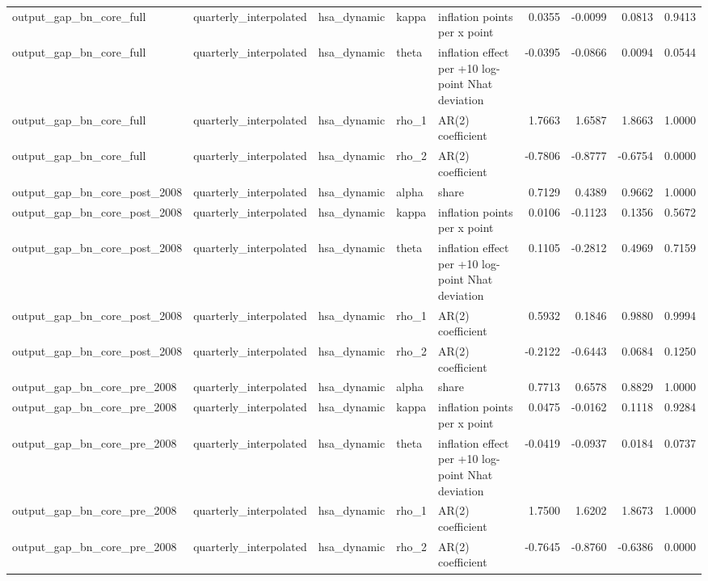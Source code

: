 \begin{tabular}{lllllrrrr}
output\_gap\_bn\_core\_full & quarterly\_interpolated & hsa\_dynamic & kappa & inflation points per x point & 0.0355 & -0.0099 & 0.0813 & 0.9413 \\
output\_gap\_bn\_core\_full & quarterly\_interpolated & hsa\_dynamic & theta & inflation effect per +10 log-point Nhat deviation & -0.0395 & -0.0866 & 0.0094 & 0.0544 \\
output\_gap\_bn\_core\_full & quarterly\_interpolated & hsa\_dynamic & rho\_1 & AR(2) coefficient & 1.7663 & 1.6587 & 1.8663 & 1.0000 \\
output\_gap\_bn\_core\_full & quarterly\_interpolated & hsa\_dynamic & rho\_2 & AR(2) coefficient & -0.7806 & -0.8777 & -0.6754 & 0.0000 \\
output\_gap\_bn\_core\_post\_2008 & quarterly\_interpolated & hsa\_dynamic & alpha & share & 0.7129 & 0.4389 & 0.9662 & 1.0000 \\
output\_gap\_bn\_core\_post\_2008 & quarterly\_interpolated & hsa\_dynamic & kappa & inflation points per x point & 0.0106 & -0.1123 & 0.1356 & 0.5672 \\
output\_gap\_bn\_core\_post\_2008 & quarterly\_interpolated & hsa\_dynamic & theta & inflation effect per +10 log-point Nhat deviation & 0.1105 & -0.2812 & 0.4969 & 0.7159 \\
output\_gap\_bn\_core\_post\_2008 & quarterly\_interpolated & hsa\_dynamic & rho\_1 & AR(2) coefficient & 0.5932 & 0.1846 & 0.9880 & 0.9994 \\
output\_gap\_bn\_core\_post\_2008 & quarterly\_interpolated & hsa\_dynamic & rho\_2 & AR(2) coefficient & -0.2122 & -0.6443 & 0.0684 & 0.1250 \\
output\_gap\_bn\_core\_pre\_2008 & quarterly\_interpolated & hsa\_dynamic & alpha & share & 0.7713 & 0.6578 & 0.8829 & 1.0000 \\
output\_gap\_bn\_core\_pre\_2008 & quarterly\_interpolated & hsa\_dynamic & kappa & inflation points per x point & 0.0475 & -0.0162 & 0.1118 & 0.9284 \\
output\_gap\_bn\_core\_pre\_2008 & quarterly\_interpolated & hsa\_dynamic & theta & inflation effect per +10 log-point Nhat deviation & -0.0419 & -0.0937 & 0.0184 & 0.0737 \\
output\_gap\_bn\_core\_pre\_2008 & quarterly\_interpolated & hsa\_dynamic & rho\_1 & AR(2) coefficient & 1.7500 & 1.6202 & 1.8673 & 1.0000 \\
output\_gap\_bn\_core\_pre\_2008 & quarterly\_interpolated & hsa\_dynamic & rho\_2 & AR(2) coefficient & -0.7645 & -0.8760 & -0.6386 & 0.0000 \\

\end{tabular}
